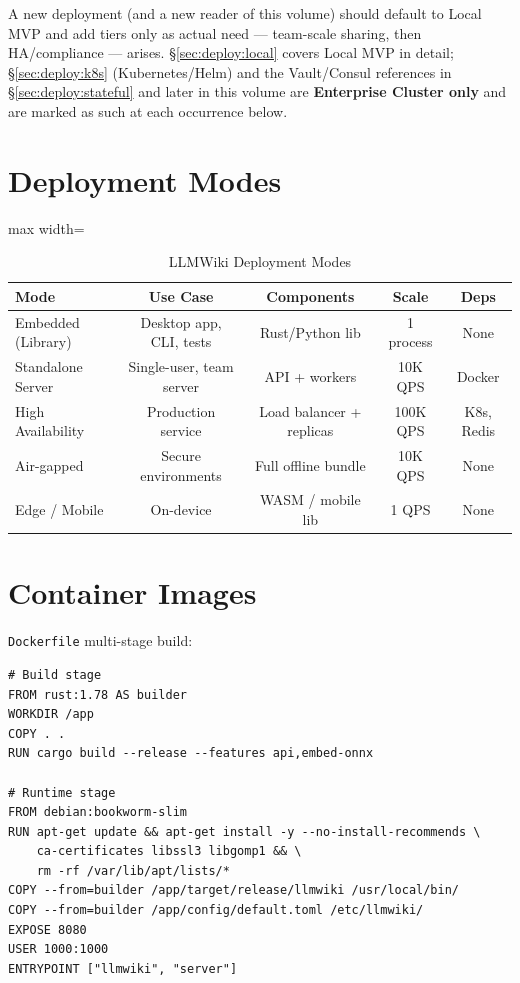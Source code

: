 A new deployment (and a new reader of this volume) should default to Local MVP and add tiers only as actual need --- team-scale sharing, then HA/compliance --- arises. \S\ref{sec:deploy:local} covers Local MVP in detail; \S\ref{sec:deploy:k8s} (Kubernetes/Helm) and the Vault/Consul references in \S\ref{sec:deploy:stateful} and later in this volume are \textbf{Enterprise Cluster only} and are marked as such at each occurrence below.

\section{Deployment Modes}
\label{sec:deploy:modes}

\begin{table}[htbp]
\centering
\caption{LLMWiki Deployment Modes}
\label{tab:deploy:modes}
\begin{adjustbox}{max width=\textwidth}
\begin{tabular}{lcccc}
\toprule
\textbf{Mode} & \textbf{Use Case} & \textbf{Components} & \textbf{Scale} & \textbf{Deps} \\
\midrule
Embedded (Library) & Desktop app, CLI, tests & Rust/Python lib & 1 process & None \\
Standalone Server & Single-user, team server & API + workers & 10K QPS & Docker \\
High Availability & Production service & Load balancer + replicas & 100K QPS & K8s, Redis \\
Air-gapped & Secure environments & Full offline bundle & 10K QPS & None \\
Edge / Mobile & On-device & WASM / mobile lib & 1 QPS & None \\
\bottomrule
\end{tabular}
\end{adjustbox}
\end{table}

\section{Container Images}
\label{sec:deploy:containers}

\texttt{Dockerfile} multi-stage build:

\begin{verbatim}
# Build stage
FROM rust:1.78 AS builder
WORKDIR /app
COPY . .
RUN cargo build --release --features api,embed-onnx

# Runtime stage
FROM debian:bookworm-slim
RUN apt-get update && apt-get install -y --no-install-recommends \
    ca-certificates libssl3 libgomp1 && \
    rm -rf /var/lib/apt/lists/*
COPY --from=builder /app/target/release/llmwiki /usr/local/bin/
COPY --from=builder /app/config/default.toml /etc/llmwiki/
EXPOSE 8080
USER 1000:1000
ENTRYPOINT ["llmwiki", "server"]
\end{verbatim}

